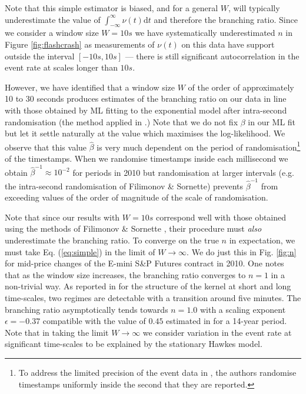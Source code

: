 \documentclass{article}
\newcommand{\tmem}[1]{{\em #1\/}}
\begin{document}
Note that this simple estimator is biased, and for a general $W$, will
typically underestimate the value of $\int_{- \infty}^{\infty} \nu (t)
\mathrm{d} t$ and therefore the branching ratio. Since we consider a window
size $W = 10 s$ we have systematically underestimated $n$ in Figure
\ref{fig:flashcrash} as measurements of $\nu (t)$ on this data have support
outside the interval $[- 10 s, 10 s]$ ---  there is still significant
autocorrelation in the event rate at scales longer than $10 s$.

However, we have identified that a window size $W$ of the order of
approximately 10 to 30 seconds produces estimates of the branching ratio on
our data in line with those obtained by ML fitting to the exponential model
after intra-second randomisation (the method applied in {\cite{filimonov}}.)
Note that we do not fix $\beta$ in our ML fit but let it settle naturally at
the value which maximises the log-likelihood. We observe that this value
$\hat{\beta}$ is very much dependent on the period of
randomisation\footnote{To address the limited precision of the event data in
{\cite{filimonov}}, the authors randomise timestamps uniformly inside the
second that they are reported.} of the timestamps. When we randomise
timestamps inside each millisecond we obtain $\hat{\beta}^{- 1} \approx 10^{-
2}$ for periods in 2010 but randomisation at larger intervals (e.g. the
intra-second randomisation of Filimonov \& Sornette) prevents $\hat{\beta}^{-
1}$ from exceeding values of the order of magnitude of the scale of
randomisation.

Note that since our results with $W = 10 s$ correspond well with those
obtained using the methods of Filimonov \& Sornette {\cite{filimonov}}, their
procedure must {\tmem{also}} underestimate the branching ratio. To converge on
the true $n$ in expectation, we must take Eq. (\ref{eq:simple}) in the limit
of $W \to \infty$. We do just this in Fig. \ref{fig:n} for mid-price changes
of the E-mini S\&P Futures contract in 2010. One notes that as the window size
increases, the branching ratio converges to $n = 1$ in a non-trivial way. As
reported in {\cite{criticalreflexivity}} for the structure of the kernel at
short and long time-scales, two regimes are detectable with a transition
around five minutes. The branching ratio asymptotically tends towards $n =
1.0$ with a scaling exponent $\epsilon = - 0.37$ compatible with the value of
$0.45$ estimated in {\cite{criticalreflexivity}} for a 14-year period. Note
that in taking the limit $W \to \infty$ we consider variation in the event
rate at significant time-scales to be explained by the stationary Hawkes
model.
\end{document}

